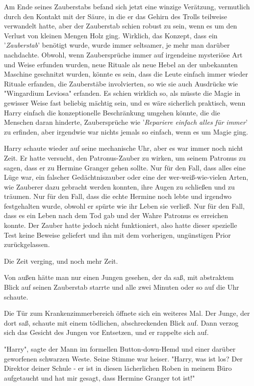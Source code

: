 {Am Ende seines Zauberstabs befand sich jetzt eine winzige Verätzung, vermutlich durch den Kontakt mit der Säure, in die er das Gehirn des Trolls teilweise verwandelt hatte, aber der Zauberstab schien robust zu sein, wenn es um den Verlust von kleinen Mengen Holz ging. Wirklich, das Konzept, dass ein '\emph{Zauberstab}' benötigt wurde, wurde immer seltsamer, je mehr man darüber nachdachte. Obwohl, wenn Zaubersprüche immer auf irgendeine mysteriöse Art und Weise erfunden wurden, neue Rituale als neue Hebel an der unbekannten Maschine geschnitzt wurden, könnte es sein, dass die Leute einfach immer wieder Rituale erfanden, die Zauberstäbe involvierten, so wie sie auch Ausdrücke wie "Wingardium Leviosa" erfanden. Es schien wirklich so, als müsste die Magie in gewisser Weise fast beliebig mächtig sein, und es wäre sicherlich praktisch, wenn Harry einfach die konzeptionelle Beschränkung umgehen könnte, die die Menschen daran hinderte, Zaubersprüche wie '\emph{Repariere einfach alles für immer}' zu erfinden, aber irgendwie war nichts jemals so einfach, wenn es um Magie ging.

Harry schaute wieder auf seine mechanische Uhr, aber es war immer noch nicht Zeit. Er hatte versucht, den Patronus-Zauber zu wirken, um seinem Patronus zu sagen, dass er zu Hermine Granger gehen sollte. Nur für den Fall, dass alles eine Lüge war, ein falscher Gedächtniszauber oder eine der wer-weiß-wie-vielen Arten, wie Zauberer dazu gebracht werden konnten, ihre Augen zu schließen und zu träumen. Nur für den Fall, dass die echte Hermine noch lebte und irgendwo festgehalten wurde, obwohl er spürte wie ihr Leben sie verließ. Nur für den Fall, dass es ein Leben nach dem Tod gab und der Wahre Patronus es erreichen konnte. Der Zauber hatte jedoch nicht funktioniert, also hatte dieser spezielle Test keine Beweise geliefert und ihn mit dem vorherigen, ungünstigen Prior zurückgelassen.

Die Zeit verging, und noch mehr Zeit.

Von außen hätte man nur einen Jungen gesehen, der da saß, mit abstraktem Blick auf seinen Zauberstab starrte und alle zwei Minuten oder so auf die Uhr schaute.

Die Tür zum Krankenzimmerbereich öffnete sich ein weiteres Mal. Der Junge, der dort saß, schaute mit einem tödlichen, abschreckenden Blick auf. Dann verzog sich das Gesicht des Jungen vor Entsetzen, und er rappelte sich auf.

"Harry", sagte der Mann im formellen Button-down-Hemd und einer darüber geworfenen schwarzen Weste. Seine Stimme war heiser. "Harry, was ist los? Der Direktor deiner Schule - er ist in diesen lächerlichen Roben in meinem Büro aufgetaucht und hat mir gesagt, dass Hermine Granger tot ist!"

}
